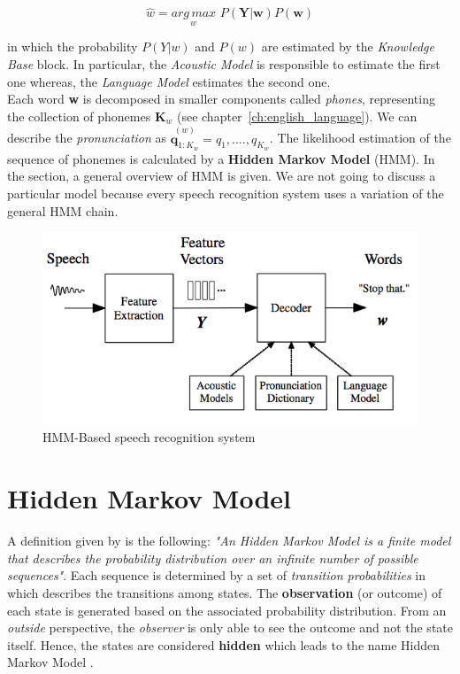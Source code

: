 \begin{equation}
	\widehat{w} = \underset{w}{arg \, max} \,\, P (\textbf{Y}|\textbf{w}) P(\textbf{w})
\end{equation}

\noindent in which the probability $P(Y|w)$ and $P(w)$ are estimated by the \textit{Knowledge Base} block. In particular, the \textit{Acoustic Model} is responsible to estimate the first one whereas, the \textit{Language Model} estimates the second one. \\
\noindent Each word \textbf{w} is decomposed in smaller components called \textit{phones}, representing the collection of phonemes $\textbf{K}_{w}$ (see chapter~\ref{ch:english_language}). We can describe the \textit{pronunciation} as $\overset{(w)}{\textbf{q}_{1:K_{w}}} = q_{1}, ...., q_{K_{w}}$. The likelihood estimation of the sequence of phonemes is calculated by a \textbf{Hidden Markov Model} (HMM). In the section, a general overview of HMM is given. We are not going to discuss a particular model because every speech recognition system uses a variation of the general HMM chain. \\

\begin{figure}[!ht]
	\centering
	\includegraphics[scale=0.8]{Figures/speech_Architecture.png}
	\caption{HMM-Based speech recognition system \cite{gales2008application}}
	\label{fig:speech_architecture}
\end{figure}

\section{Hidden Markov Model}
\label{sec:hmm}
\noindent A definition given by \cite{eddy1996hidden} is the following: \textit{"An Hidden Markov Model is a finite model that describes the probability distribution over an infinite number of possible sequences"}. Each sequence is determined by a set of \textit{transition probabilities} in which describes the transitions among states. The \textbf{observation} (or outcome) of each state is generated based on the associated probability distribution. From an \textit{outside} perspective, the \textit{observer} is only able to see the outcome and not the state itself. Hence, the states are considered \textbf{hidden} which leads to the name Hidden Markov Model \cite{def_hmm}. \\

